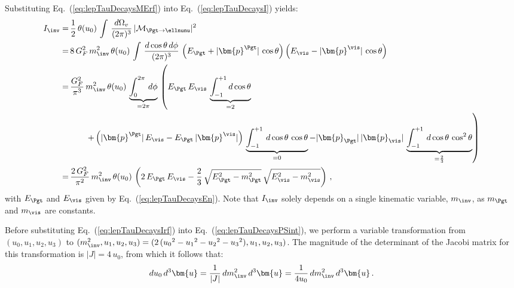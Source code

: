 Substituting Eq.~(\ref{eq:lepTauDecaysMErf}) into Eq.~(\ref{eq:lepTauDecaysI}) yields:
\begin{align}
I_{\inv} 
= & \, \frac{1}{2} \, \theta ( u_{0} ) \, \int \, \frac{d\Omega_{v}}{(2\pi)^{3}} \, \vert\mathcal{M}_{\Pgt \to
  \ellnunu}\vert^{2} \nonumber \\
= & \, 8 \, G^{2}_{F} \, m^{2}_{\inv} \, \theta ( u_{0} ) \, \int \, \frac{d\cos\theta \, d\phi}{(2\pi)^{3}} \, 
  \left( E_{\Pgt} + \vert\bm{p}^{\Pgt}\vert \, \cos\theta \right)  \left( E_{\vis} - \vert\bm{p}^{\vis}\vert \, \cos\theta \right) \nonumber \\
= & \, \frac{G^{2}_{F}}{\pi^{3}} \, m^{2}_{\inv} \, \theta ( u_{0} ) \, \underbrace{\int_{0}^{2 \pi} \, d\phi}_{= 2 \pi} \, 
  \left( E_{\Pgt} \, E_{\vis} \, \underbrace{\int_{-1}^{+1}
      d\cos\theta}_{= 2} \right. \nonumber \\
& \qquad
     \left. + \left( \vert\bm{p}^{\Pgt}\vert \, E_{\vis} - E_{\Pgt} \,
       \vert\bm{p}^{\vis}\vert \right) \,
     \underbrace{\int_{-1}^{+1} \, d\cos\theta \, \cos\theta}_{= 0} 
  - \vert\bm{p}_{\Pgt}\vert \, \vert\bm{p}_{\vis}\vert
       \, \underbrace{\int_{-1}^{+1} \, d\cos\theta \, \cos^{2}\theta}_{= \frac{2}{3}} \right) \nonumber \\
= & \, \frac{2 \, G^{2}_{F}}{\pi^{2}} \, m^{2}_{\inv} \, \theta ( u_{0} ) \, 
  \left( 2 \, E_{\Pgt} \, E_{\vis} - \frac{2}{3} \, \sqrt{E_{\Pgt}^{2} - m^{2}_{\Pgt}} \, \sqrt{E_{\vis}^{2} - m^{2}_{\vis}} \right) \, ,
\label{eq:lepTauDecaysIrf}
\end{align}
with $E_{\Pgt}$ and $E_{\vis}$ given by Eq.~(\ref{eq:lepTauDecaysEn}).
Note that $I
_{\inv}$ solely depends on a single kinematic variable, $m_{\inv}$, 
as $m_{\Pgt}$ and $m_{\vis}$ are constants.

Before substituting Eq.~(\ref{eq:lepTauDecaysIrf}) into Eq.~(\ref{eq:lepTauDecaysPSint}),
we perform a variable transformation from $( u_{0}, u_{1}, u_{2}, u_{3} )$ to $( m^{2}_{\inv}, u_{1}, u_{2}, u_{3} ) = ( 2 \, ( {u_{0}}^{2} - {u_{1}}^{2} - {u_{2}}^{2} - {u_{3}}^{2}), u_{1}, u_{2}, u_{3} )$.
The magnitude of the determinant of the Jacobi matrix for this transformation is $\vert J
\vert = 4 \, u_{0}$,
from which it follows that:
\begin{equation}
du_{0} \, d^{3}\bm{u} = \frac{1}{\vert J \vert} \, dm^{2}_{\inv} \,
d^{3}\bm{u} = \frac{1}{4 u_{0}} \, dm^{2}_{\inv} \, d^{3}\bm{u} \, .
\label{eq:lepTauDecaysJacobi}
\end{equation}

